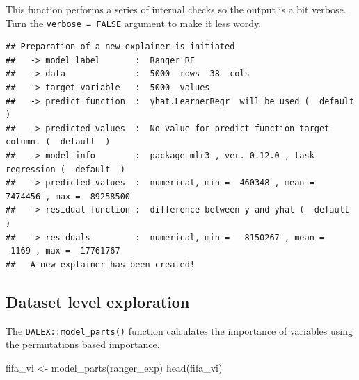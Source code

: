 \documentclass[
]{scrbook}
\newenvironment{Shaded}{\begin{snugshade}}{\end{snugshade}}
\newcommand{\AttributeTok}[1]{\textcolor[rgb]{0.77,0.63,0.00}{#1}}
\newcommand{\ConstantTok}[1]{\textcolor[rgb]{0.00,0.00,0.00}{#1}}
\newcommand{\FunctionTok}[1]{\textcolor[rgb]{0.00,0.00,0.00}{#1}}
\newcommand{\NormalTok}[1]{#1}
\newcommand{\OtherTok}[1]{\textcolor[rgb]{0.56,0.35,0.01}{#1}}
\newcommand{\SpecialCharTok}[1]{\textcolor[rgb]{0.00,0.00,0.00}{#1}}
\newcommand{\StringTok}[1]{\textcolor[rgb]{0.31,0.60,0.02}{#1}}
\renewenvironment{Shaded} {\begin{snugshade}\small} {\end{snugshade}}
\begin{document}
This function performs a series of internal checks so the output is a bit verbose. Turn the \texttt{verbose\ =\ FALSE} argument to make it less wordy.

\begin{Shaded}
\end{Shaded}

\begin{verbatim}
## Preparation of a new explainer is initiated
##   -> model label       :  Ranger RF 
##   -> data              :  5000  rows  38  cols 
##   -> target variable   :  5000  values 
##   -> predict function  :  yhat.LearnerRegr  will be used (  default  )
##   -> predicted values  :  No value for predict function target column. (  default  )
##   -> model_info        :  package mlr3 , ver. 0.12.0 , task regression (  default  ) 
##   -> predicted values  :  numerical, min =  460348 , mean =  7474456 , max =  89258500  
##   -> residual function :  difference between y and yhat (  default  )
##   -> residuals         :  numerical, min =  -8150267 , mean =  -1169 , max =  17761767  
##   A new explainer has been created!
\end{verbatim}

\hypertarget{interpretability-dataset-level}{%
\subsection{Dataset level exploration}\label{interpretability-dataset-level}}

The \href{https://www.rdocumentation.org/packages/DALEX/topics/model_parts}{\texttt{DALEX::model\_parts()}} function calculates the importance of variables using the \href{https://pbiecek.github.io/ema/featureImportance.html}{permutations based importance}.

\begin{Shaded}
\begin{Highlighting}[]
\NormalTok{fifa\_vi }\OtherTok{\textless{}{-}} \FunctionTok{model\_parts}\NormalTok{(ranger\_exp)}
\FunctionTok{head}\NormalTok{(fifa\_vi)}
\end{Highlighting}
\end{Shaded}
\end{document}

